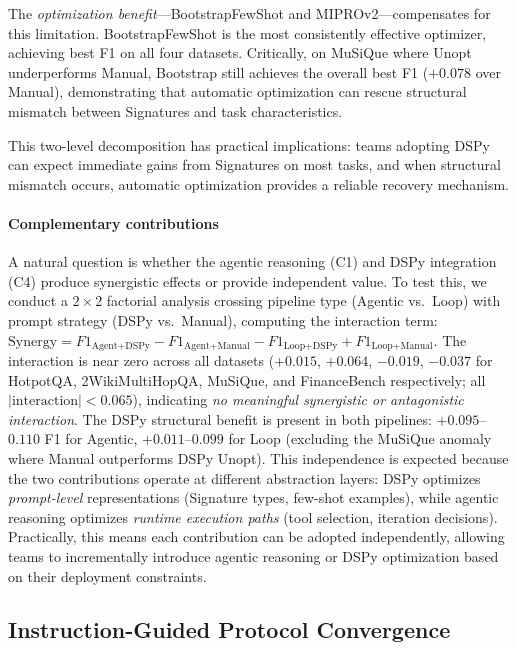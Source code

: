The \emph{optimization benefit}---BootstrapFewShot and MIPROv2---compensates for this limitation.
BootstrapFewShot is the most consistently effective optimizer, achieving best F1 on all four datasets.
Critically, on MuSiQue where Unopt underperforms Manual, Bootstrap still achieves the overall best F1 ($+0.078$ over Manual), demonstrating that automatic optimization can rescue structural mismatch between Signatures and task characteristics.

This two-level decomposition has practical implications: teams adopting DSPy can expect immediate gains from Signatures on most tasks, and when structural mismatch occurs, automatic optimization provides a reliable recovery mechanism.

\paragraph{Complementary contributions}
A natural question is whether the agentic reasoning (C1) and DSPy integration (C4) produce synergistic effects or provide independent value.
To test this, we conduct a $2 \times 2$ factorial analysis crossing pipeline type (Agentic vs.\ Loop) with prompt strategy (DSPy vs.\ Manual), computing the interaction term: $\text{Synergy} = F1_{\text{Agent+DSPy}} - F1_{\text{Agent+Manual}} - F1_{\text{Loop+DSPy}} + F1_{\text{Loop+Manual}}$.
The interaction is near zero across all datasets ($+0.015$, $+0.064$, $-0.019$, $-0.037$ for HotpotQA, 2WikiMultiHopQA, MuSiQue, and FinanceBench respectively; all $|\text{interaction}| < 0.065$), indicating \emph{no meaningful synergistic or antagonistic interaction}.
The DSPy structural benefit is present in both pipelines: $+0.095$--$0.110$ F1 for Agentic, $+0.011$--$0.099$ for Loop (excluding the MuSiQue anomaly where Manual outperforms DSPy Unopt).
This independence is expected because the two contributions operate at different abstraction layers: DSPy optimizes \emph{prompt-level} representations (Signature types, few-shot examples), while agentic reasoning optimizes \emph{runtime execution paths} (tool selection, iteration decisions).
Practically, this means each contribution can be adopted independently, allowing teams to incrementally introduce agentic reasoning or DSPy optimization based on their deployment constraints.

\subsection{Instruction-Guided Protocol Convergence}
\label{subsec:emergent}

